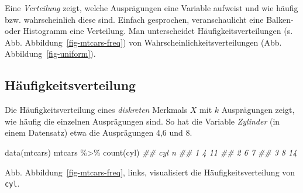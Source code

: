 \documentclass[
  a4paper,
  DIV=11]{scrreprt}
\newenvironment{Shaded}{\begin{snugshade}}{\end{snugshade}}
\newcommand{\DocumentationTok}[1]{\textcolor[rgb]{0.37,0.37,0.37}{\textit{#1}}}
\newcommand{\FunctionTok}[1]{\textcolor[rgb]{0.28,0.35,0.67}{#1}}
\newcommand{\NormalTok}[1]{\textcolor[rgb]{0.00,0.23,0.31}{#1}}
\newcommand{\SpecialCharTok}[1]{\textcolor[rgb]{0.37,0.37,0.37}{#1}}
\theoremstyle{definition}
\theoremstyle{remark}
\begin{document}
\begin{tcolorbox}[enhanced jigsaw, leftrule=.75mm, toptitle=1mm, bottomtitle=1mm, titlerule=0mm, breakable, colframe=quarto-callout-important-color-frame, title=\textcolor{quarto-callout-important-color}{\faExclamation}\hspace{0.5em}{Wichtig}, rightrule=.15mm, colback=white, arc=.35mm, left=2mm, bottomrule=.15mm, coltitle=black, opacitybacktitle=0.6, toprule=.15mm, colbacktitle=quarto-callout-important-color!10!white, opacityback=0]
Eine \emph{Verteilung} zeigt, welche Ausprägungen eine Variable aufweist
und wie häufig bzw. wahrscheinlich diese sind. Einfach gesprochen,
veranschaulicht eine Balken- oder Histogramm eine Verteilung. Man
unterscheidet Häufigkeitsverteilungen (s. Abb.
Abbildung~\ref{fig-mtcars-freq}) von Wahrscheinlichkeitsverteilungen
(Abb. Abbildung~\ref{fig-uniform}).
\end{tcolorbox}

\hypertarget{huxe4ufigkeitsverteilung}{%
\subsection{Häufigkeitsverteilung}\label{huxe4ufigkeitsverteilung}}

Die Häufigkeitsverteilung eines \emph{diskreten} Merkmals \(X\) mit
\(k\) Ausprägungen zeigt, wie häufig die einzelnen Ausprägungen sind. So
hat die Variable \emph{Zylinder} (in einem Datensatz) etwa die
Ausprägungen 4,6 und 8.

\begin{Shaded}
\begin{Highlighting}[]
\FunctionTok{data}\NormalTok{(mtcars)}
\NormalTok{  mtcars }\SpecialCharTok{\%\textgreater{}\%} 
    \FunctionTok{count}\NormalTok{(cyl)}
\DocumentationTok{\#\#   cyl  n}
\DocumentationTok{\#\# 1   4 11}
\DocumentationTok{\#\# 2   6  7}
\DocumentationTok{\#\# 3   8 14}
\end{Highlighting}
\end{Shaded}

Abb. Abbildung~\ref{fig-mtcars-freq}, links, visualisiert die
Häufigkeitsverteilung von \texttt{cyl}.
\end{document}
